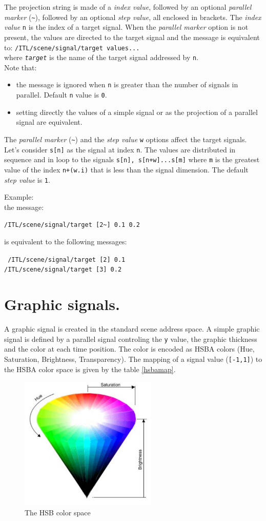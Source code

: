 \documentclass[a4paper,twoside]{report}
\newcommand{\sublevel}[1]	{\section{#1}}
\newcommand{\OSC}[1]		{\texttt{#1}}
\newcommand{\values}[1]	{\texttt{#1}}
\newcommand{\example}		{\hspace*{1cm}}
\newcommand{\sample}	[1]			{\begin{center}\colorbox{mygrey}{
								\begin{minipage}[t]{0.9\columnwidth} 
								{\small \texttt{#1}}
								\end{minipage}}\end{center}}
\begin{document}
The projection string is made of a \emph{index value}, followed by an optional \emph{parallel marker} (\OSC{\~{}}), followed by an optional \emph{step value}, all enclosed in brackets.
The \emph{index value} \values{n} is the index of a target signal. When the \emph{parallel marker} option is not present, the values are directed to the target signal and the message is equivalent to:
\example \texttt{/ITL/scene/signal/target values...} \\
where \OSC{\textit{target}} is the name of the target signal addressed by \values{n}. \\
Note that:
\begin{itemize}
\item the message is ignored when \values{n} is greater than the number of signals in parallel. Default \values{n} value is \values{0}. 
\item setting directly the values of a simple signal or as the projection of a parallel signal are equivalent.
\end{itemize}

The \emph{parallel marker} (\OSC{\~{}}) and the \emph{step value} \values{w} options affect the target signals. Let's consider \values{s[n]} as the signal at index \values{n}. The values are distributed in sequence and in loop to the signals \values{s[n], s[n+w]...s[m]} where \values{m} is the greatest value of the index \values{n+(w.i)} that is less than the signal dimension. The default  \emph{step value} is \values{1}.

Example: \\
\example the message: 
\sample{/ITL/scene/signal/target [2\~{}] 0.1 0.2}
\example is equivalent to the following messages:
\ \sample{
/ITL/scene/signal/target [2] 0.1\\
/ITL/scene/signal/target [3] 0.2
}


\sublevel{Graphic signals.}
\label{gsignal}

A graphic signal is created in the standard scene address space. A simple graphic signal is defined by a parallel signal controling the \values{y} value, the graphic thickness and the color at each time position. The color is encoded as HSBA colors (Hue, Saturation, Brightness, Transparency). The mapping of a signal value  (\values{[-1,1]}) to the HSBA color space is given by the table \ref{hsbamap}. 

\begin{figure}[h]
	\centering \includegraphics[width=65mm]{imgs/hsb}
 \caption{The HSB color space}
 \label{hsbfiug}
\end{figure}
\end{document}
